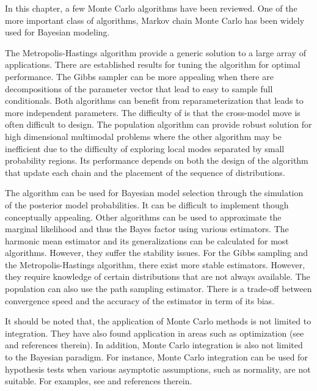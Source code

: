 In this chapter, a few Monte Carlo algorithms have been reviewed. One of the
more important class of algorithms, Markov chain Monte Carlo has been widely
used for Bayesian modeling.

The Metropolis-Hastings algorithm provide a generic solution to a large array
of applications. There are established results for tuning the algorithm for
optimal performance. The Gibbs sampler can be more appealing when there are
decompositions of the parameter vector that lead to easy to sample full
conditionals. Both algorithms can benefit from reparameterization that leads
to more independent parameters. The difficulty of \rjmcmc is that the
cross-model move is often difficult to design. The population \mcmc algorithm
can provide robust solution for high dimensional multimodal problems where the
other algorithm may be inefficient due to the difficulty of exploring local
modes separated by small probability regions. Its performance depends on both
the design of the \mcmc algorithm that update each chain and the placement of
the sequence of distributions.

The \rjmcmc algorithm can be used for Bayesian model selection through the
simulation of the posterior model probabilities. It can be difficult to
implement though conceptually appealing. Other algorithms can be used to
approximate the marginal likelihood and thus the Bayes factor using various
estimators. The harmonic mean estimator and its generalizations can be
calculated for most \mcmc algorithms. However, they suffer the stability
issues. For the Gibbs sampling and the Metropolis-Hastings algorithm, there
exist more stable estimators. However, they require knowledge of certain
distributions that are not always available. The population \mcmc can also use
the path sampling estimator. There is a trade-off between convergence speed
and the accuracy of the estimator in term of its bias.

It should be noted that, the application of Monte Carlo methods is not limited
to integration. They have also found application in areas such as optimization
(see \cite[][chap.~5]{Robert:2004tn} and references therein). In addition,
Monte Carlo integration is also not limited to the Bayesian paradigm. For
instance, Monte Carlo integration can be used for hypothesis tests when
various asymptotic assumptions, such as normality, are not suitable. For
examples, see \cite[][sec.~3.2]{Robert:2004tn} and references therein.

